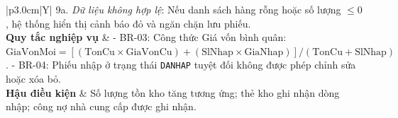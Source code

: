 \documentclass[12pt,a4paper]{report}
\renewcommand{\_}{\textunderscore\allowbreak}
\begin{document}
\begin{table}[H]
\begin{tabularx}{\textwidth}{|p{3.0cm}|Y|}
{9a. \textit{Dữ liệu không hợp lệ}: Nếu danh sách hàng rỗng hoặc số lượng $\le 0$, hệ thống hiển thị cảnh báo đỏ và ngăn chặn lưu phiếu.
} \\
\hline
\textbf{Quy tắc nghiệp vụ} & - BR-03: Công thức Giá vốn bình quân: $\text{GiaVonMoi} = [(\text{TonCu} \times \text{GiaVonCu}) + (\text{SlNhap} \times \text{GiaNhap})] / (\text{TonCu} + \text{SlNhap})$.\newline
- BR-04: Phiếu nhập ở trạng thái \texttt{DA\_NHAP} tuyệt đối không được phép chỉnh sửa hoặc xóa bỏ. \\
\hline
\textbf{Hậu điều kiện} & Số lượng tồn kho tăng tương ứng; thẻ kho ghi nhận dòng nhập; công nợ nhà cung cấp được ghi nhận. \\
\hline
\end{tabularx}
\caption{Bảng đặc tả Use Case UC-02: Lập Phiếu Nhập hàng từ Nhà cung cấp}
\label{tab:uc_spec_nhaphang}
\end{table}

\clearpage
\end{document}
